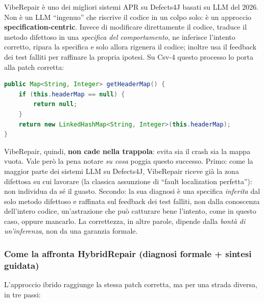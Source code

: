 VibeRepair \cite{zhu2026specification} è uno dei migliori sistemi APR su Defects4J basati su LLM
del 2026. Non è un LLM ``ingenuo'' che riscrive il codice in un colpo solo: è un approccio
\textbf{specification-centric}. Invece di modificare direttamente il codice, traduce il metodo
difettoso in una \emph{specifica del comportamento}, ne inferisce l'intento corretto, ripara la
specifica e solo allora rigenera il codice; inoltre usa il feedback dei test falliti per
raffinare la propria ipotesi. Su Csv-4 questo processo lo porta alla patch corretta:

\begin{lstlisting}[language=Java]
public Map<String, Integer> getHeaderMap() {
    if (this.headerMap == null) {
        return null;
    }
    return new LinkedHashMap<String, Integer>(this.headerMap);
}
\end{lstlisting}

VibeRepair, quindi, \textbf{non cade nella trappola}: evita sia il crash sia la mappa vuota. Vale
però la pena notare \emph{su cosa} poggia questo successo. Primo: come la maggior parte dei
sistemi LLM su Defects4J, VibeRepair riceve già la zona difettosa su cui lavorare (la classica
assunzione di ``fault localization perfetta''): non individua da sé il guasto. 
Secondo: la sua diagnosi è una specifica \emph{inferita} dal solo metodo difettoso e raffinata sul
feedback dei test falliti, non dalla conoscenza dell'intero codice, un'astrazione che può catturare bene
l'intento, come in questo caso, oppure mancarlo. La correttezza, in altre parole, dipende
dalla \textit{bontà di un'inferenza}, non da una garanzia formale.

\subsubsection{Come la affronta HybridRepair (diagnosi formale + sintesi guidata)}

L'approccio ibrido raggiunge la stessa patch corretta, ma per una strada diversa, in tre passi:

